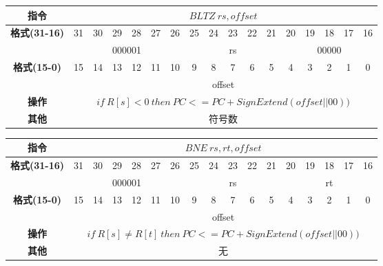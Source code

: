 \documentclass[11pt,utf8]{article}
\begin{document}
\begin{center}
\begin{tabular}{|c|c|c|c|c|c|c|c|c|c|c|c|c|c|c|c|c|}
\hline
\textbf{指令} & \multicolumn{16}{c|}{$BLTZ~rs,offset$} \\
\hline
\multirow{2}{*}{\textbf{格式(31-16)}} & 31 & 30 & 29 & 28 & 27 & 26 & 25 & 24 & 23 & 22 & 21 & 20 & 19 & 18 & 17 & 16 \\ 
\cline{2-17}
& \multicolumn{6}{c|}{000001} & \multicolumn{5}{c|}{rs} & \multicolumn{5}{c|}{00000}\\
\hline
\multirow{2}{*}{\textbf{格式(15-0)}} & 15 & 14 & 13 & 12 & 11 & 10 & 9 & 8 & 7 & 6 & 5 & 4 & 3 & 2 & 1 & 0 \\
\cline{2-17}
& \multicolumn{16}{c|}{offset}\\
\hline
\textbf{操作} & \multicolumn{16}{c|}{$if~R[s] < 0~then~PC<= PC + SignExtend(offset||00))$} \\
\hline
\textbf{其他} & \multicolumn{16}{c|}{符号数} \\
\hline
\end{tabular}
\end{center}

\begin{center}
\begin{tabular}{|c|c|c|c|c|c|c|c|c|c|c|c|c|c|c|c|c|}
\hline
\textbf{指令} & \multicolumn{16}{c|}{$BNE~rs,rt,offset$} \\
\hline
\multirow{2}{*}{\textbf{格式(31-16)}} & 31 & 30 & 29 & 28 & 27 & 26 & 25 & 24 & 23 & 22 & 21 & 20 & 19 & 18 & 17 & 16 \\ 
\cline{2-17}
& \multicolumn{6}{c|}{000001} & \multicolumn{5}{c|}{rs} & \multicolumn{5}{c|}{rt}\\
\hline
\multirow{2}{*}{\textbf{格式(15-0)}} & 15 & 14 & 13 & 12 & 11 & 10 & 9 & 8 & 7 & 6 & 5 & 4 & 3 & 2 & 1 & 0 \\
\cline{2-17}
& \multicolumn{16}{c|}{offset}\\
\hline
\textbf{操作} & \multicolumn{16}{c|}{$if~R[s] \ne R[t]~then~PC<= PC + SignExtend(offset||00))$} \\
\hline
\textbf{其他} & \multicolumn{16}{c|}{无} \\
\hline
\end{tabular}
\end{center}
\end{document}
